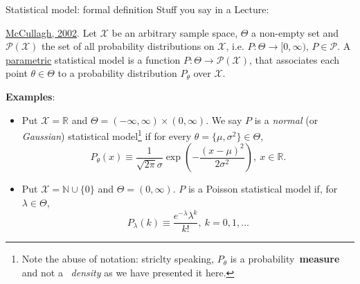 \begin{frame}{Statistical model: formal definition}
Stuff you say in a Lecture:
\begin{defn}
\label{def:statistical_model_formal}
\href{https://projecteuclid.org/download/pdf_1/euclid.aos/1035844977}{McCullagh, 2002}.
Let $\mathcal{X}$ be an arbitrary sample space, $\Theta$ a non-empty set and $\mathcal{P}(\mathcal{X})$ the set of all probability distributions on $\mathcal{X}$, i.e. $P : \Theta \to [0, \infty)$, $P \in \mathcal{P}$.
 A \underline{parametric} statistical model is a function $P : \Theta \to \mathcal{P}(\mathcal{X})$, that associates each point $\theta \in \Theta$ to a probability distribution $P_\theta$ over $\mathcal{X}$.
\end{defn}
\textbf{Examples}:
\begin{itemize}
 \item Put $\mathcal{X} = \mathbb{R}$ and $\Theta = (-\infty, \infty)\times (0, \infty)$.
 We say $P$ is a \textit{normal} (or \textit{Gaussian}) statistical model\footnote{Note the abuse of notation: striclty speaking, $P_\theta$  is a probability~\textbf{measure} and not a ~\textit{density} as we have presented it here.} if for every $\theta = \{\mu, \sigma^2\} \in \Theta$,
 $$P_{\theta}(x) \equiv \frac{1}{\sqrt{2\pi}\sigma}\exp\left(-\frac{(x-\mu)^2}{2\sigma^2}\right), \: x \in \mathbb{R}.$$
 \item Put $\mathcal{X} = \mathbb{N}\cup \{0\}$ and $\Theta = (0, \infty)$.
 $P$ is a Poisson statistical model if, for $\lambda \in \Theta$,
 $$P_{\lambda}(k) \equiv \frac{e^{-\lambda}\lambda^k}{k!}, \: k = 0, 1, \ldots$$
\end{itemize} 
\end{frame}
